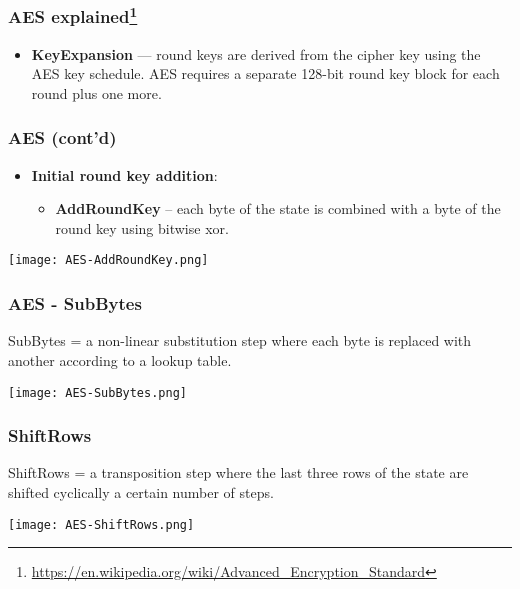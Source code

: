 \documentclass[
hyperref={pdfpagelabels=false}
,xcolor=table
]
{beamer}
\begin{document}
\begin{frame}[fragile]
  \frametitle{AES explained\footnote{\url{https://en.wikipedia.org/wiki/Advanced_Encryption_Standard}}}

  \begin{itemize}
  \item \textbf{KeyExpansion} --- round keys are derived from the
    cipher key using the AES key schedule. AES requires a separate
    128-bit round key block for each round plus one more.
  \end{itemize}
\end{frame}



\begin{frame}[fragile]
  \frametitle{AES (cont'd)}
  \begin{itemize}
  \item \textbf{Initial round key addition}:

    \begin{itemize}
    \item \textbf{AddRoundKey} – each byte of the state is combined with a byte
      of the round key using bitwise xor.
    \end{itemize}
  \end{itemize}

  \begin{center}
  \texttt{[image: AES-AddRoundKey.png]}
\end{center}
  
  
\end{frame}



\begin{frame}
  \frametitle{AES - SubBytes}

  SubBytes = a non-linear substitution step where each byte is
  replaced with another according to a lookup table.

  \begin{center}
    \texttt{[image: AES-SubBytes.png]}
  \end{center}
 
\end{frame}


\begin{frame}
  \frametitle{ShiftRows}
  ShiftRows = a transposition step where the last three rows of the state are shifted cyclically a certain number of steps.  


  \begin{center}
    \texttt{[image: AES-ShiftRows.png]}
  \end{center}
 
\end{frame}
\end{document}
